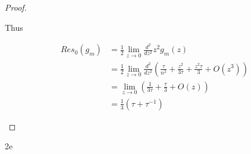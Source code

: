 \documentclass{article}
\begin{document}
\begin{proof}
\begin{enumerate}
        Thus 

        \begin{align*}
            Res_0(g_m) &= \frac{1}{2} \lim_{z \to 0} \frac{d^2}{dz^2} z^2 g_m(z) \\
            &= \frac{1}{2} \lim_{z \to 0} \frac{d^2}{dz^2}\left(\frac{\tau}{n^2} + \frac{z^2}{3 \tau} + \frac{z^2 \tau}{3} + O(z^3)\right) \\
            &= \lim_{z \to 0}\left(\frac{1}{3 \tau} + \frac{\tau}{3} + O(z)\right) \\
            &= \frac{1}{3}(\tau + \tau^{-1})
        \end{align*}
    \end{enumerate}
\end{proof}
\begin{PROB}{2e}\label{Problem 2e.}
\end{PROB}
\end{document}
